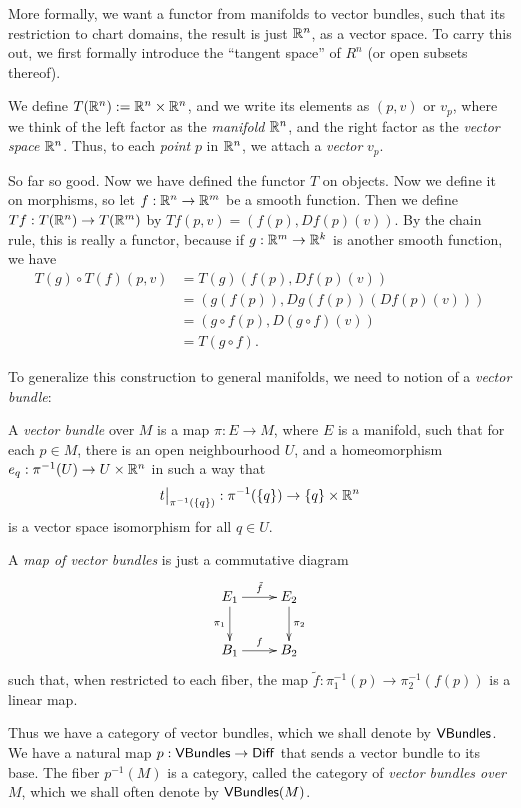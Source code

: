 \documentclass[11pt, english]{article}
\begin{document}
More formally, we want a functor from manifolds to vector bundles, such that its restriction to chart domains, the result is just $\mathbb{R}^n$, as a vector space. To carry this out, we first formally introduce the ``tangent space'' of $R^n$ (or open subsets thereof).

We define $T(\mathbb{R}^n) := \mathbb{R}^n \times \mathbb{R}^n$, and we write its elements as $(p,v)$ or $v_p$, where we think of the left factor as the \emph{manifold} $\mathbb{R}^n$, and the right factor as the \emph{vector space} $\mathbb{R}^n$. Thus, to each \emph{point} $p$ in $\mathbb{R}^n$, we attach a \emph{vector} $v_p$.

So far so good. Now we have defined the functor $T$ on objects. Now we define it on morphisms, so let $f:\mathbb{R}^n \to \mathbb{R}^m$ be a smooth function. Then we define $Tf:T(\mathbb{R}^n) \to T(\mathbb{R}^m)$ by $Tf(p,v)=(f(p),Df(p)(v))$. By the chain rule, this is really a functor, because if $g:\mathbb{R}^m \to \mathbb{R}^k$ is another smooth function, we have
\begin{align*}
T(g) \circ T(f) (p,v) &= T(g)(f(p),Df(p)(v)) \\
&= \left( g(f(p)) , Dg(f(p))(Df(p)(v))\right) \\
&= \left( g \circ f (p) , D(g \circ f)(v)   \right) \\
&= T(g \circ f).
\end{align*}

To generalize this construction to general manifolds, we need to notion of a \emph{vector bundle}:

\begin{defi}
  A \emph{vector bundle} over $M$ is a map $\pi:E \to M$, where $E$ is a manifold, such that for each $p \in M$, there is an open neighbourhood $U$, and a homeomorphism $e_q:\pi^{-1}(U) \to U \times \mathbb{R}^n$ in such a way that \[\restr{t}{\pi^{-1}(\{q\})}:\pi^{-1}(\{q\}) \to \{q \} \times \R^n\] is a vector space isomorphism for all $q \in U$.

A \emph{map of vector bundles} is just a commutative diagram
\[
\xymatrix{
E_1 \ar[d]_{\pi_1}  \ar[r]^{\tilde f} & E_2 \ar[d]^{\pi_2} \\
B_1 \ar[r]^f  & B_2
}
\]
such that, when restricted to each fiber, the map $\tilde f:\pi_1^{-1}(p) \to \pi_2^{-1}(f(p))$ is a linear map.
\end{defi}

Thus we have a category of vector bundles, which we shall denote by $\mathsf{VBundles}$. We have a natural map $p:\mathsf{VBundles} \to \mathsf{Diff}$ that sends a vector bundle to its base. The fiber $p^{-1}(M)$ is a category, called the category of \emph{vector bundles over $M$}, which we shall often denote by $\mathsf{VBundles}(M)$.
\end{document}

